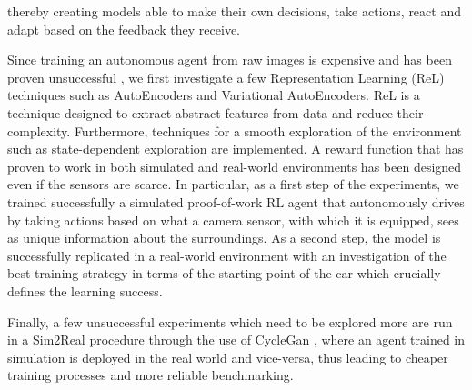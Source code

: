 thereby creating models able to make their own decisions, take actions, react and adapt based on the feedback they receive. 

Since training an autonomous agent from raw images is expensive and has been proven unsuccessful \citep{DBLP:journals/corr/abs-2008-00715}, we first investigate a few Representation Learning (ReL) techniques such as AutoEncoders and Variational AutoEncoders. ReL is a technique designed to extract abstract features from data and reduce their complexity. Furthermore, techniques for a smooth exploration of the environment such as state-dependent exploration are implemented. A reward function that has proven to work in both simulated and real-world environments has been designed even if the sensors are scarce. In particular, as a first step of the experiments, we trained successfully a simulated proof-of-work RL agent that autonomously drives by taking actions based on what a camera sensor, with which it is equipped, sees as unique information about the surroundings. As a second step, the model is successfully replicated in a real-world environment with an investigation of the best training strategy in terms of the starting point of the car which crucially defines the learning success. 

Finally, a few unsuccessful experiments which need to be explored more are run in a Sim2Real procedure through the use of CycleGan \citep{CycleGAN2017}, where an agent trained in simulation is deployed in the real world and vice-versa, thus leading to cheaper training processes and more reliable benchmarking. 